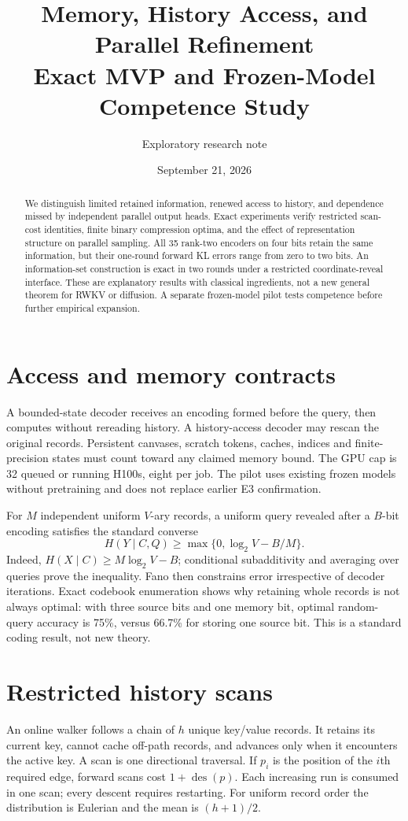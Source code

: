 \documentclass[11pt]{article}
\title{Memory, History Access, and Parallel Refinement\\\large Exact MVP and Frozen-Model Competence Study}
\author{Exploratory research note}
\date{September 21, 2026}
\begin{document}
\maketitle
\begin{abstract}
We distinguish limited retained information, renewed access to history, and dependence missed by independent parallel output heads. Exact experiments verify restricted scan-cost identities, finite binary compression optima, and the effect of representation structure on parallel sampling. All 35 rank-two encoders on four bits retain the same information, but their one-round forward KL errors range from zero to two bits. An information-set construction is exact in two rounds under a restricted coordinate-reveal interface. These are explanatory results with classical ingredients, not a new general theorem for RWKV or diffusion. A separate frozen-model pilot tests competence before further empirical expansion.
\end{abstract}
\section{Access and memory contracts}
A bounded-state decoder receives an encoding formed before the query, then computes without rereading history. A history-access decoder may rescan the original records. Persistent canvases, scratch tokens, caches, indices and finite-precision states must count toward any claimed memory bound. The GPU cap is 32 queued or running H100s, eight per job. The pilot uses existing frozen models without pretraining and does not replace earlier E3 confirmation.

For $M$ independent uniform $V$-ary records, a uniform query revealed after a $B$-bit encoding satisfies the standard converse
\[
 H(Y\mid C,Q)\ge\max\{0,\log_2V-B/M\}.
\]
Indeed, $H(X\mid C)\ge M\log_2V-B$; conditional subadditivity and averaging over queries prove the inequality. Fano then constrains error irrespective of decoder iterations. Exact codebook enumeration shows why retaining whole records is not always optimal: with three source bits and one memory bit, optimal random-query accuracy is 75\%, versus 66.7\% for storing one source bit. This is a standard coding result, not new theory.

\section{Restricted history scans}
An online walker follows a chain of $h$ unique key/value records. It retains its current key, cannot cache off-path records, and advances only when it encounters the active key. A scan is one directional traversal. If $p_i$ is the position of the $i$th required edge, forward scans cost $1+\operatorname{des}(p)$. Each increasing run is consumed in one scan; every descent requires restarting. For uniform record order the distribution is Eulerian and the mean is $(h+1)/2$.
\end{document}
